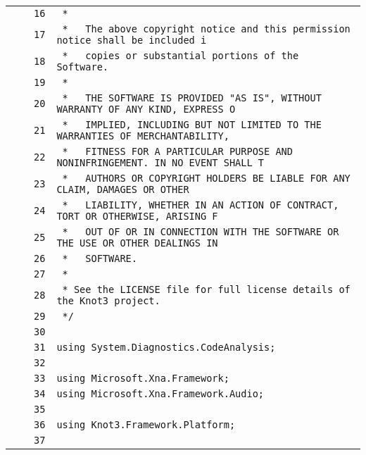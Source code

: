 \documentclass[a4paper,10pt]{article}
\begin{document}
\begin{longtable}[l]{lrrl}
\cellcolor{gray} &  & \verb~16~ & \verb~ *~\\
\cellcolor{gray} &  & \verb~17~ & \verb~ *   The above copyright notice and this permission notice shall be included i~\\
\cellcolor{gray} &  & \verb~18~ & \verb~ *   copies or substantial portions of the Software.~\\
\cellcolor{gray} &  & \verb~19~ & \verb~ *~\\
\cellcolor{gray} &  & \verb~20~ & \verb~ *   THE SOFTWARE IS PROVIDED "AS IS", WITHOUT WARRANTY OF ANY KIND, EXPRESS O~\\
\cellcolor{gray} &  & \verb~21~ & \verb~ *   IMPLIED, INCLUDING BUT NOT LIMITED TO THE WARRANTIES OF MERCHANTABILITY,~\\
\cellcolor{gray} &  & \verb~22~ & \verb~ *   FITNESS FOR A PARTICULAR PURPOSE AND NONINFRINGEMENT. IN NO EVENT SHALL T~\\
\cellcolor{gray} &  & \verb~23~ & \verb~ *   AUTHORS OR COPYRIGHT HOLDERS BE LIABLE FOR ANY CLAIM, DAMAGES OR OTHER~\\
\cellcolor{gray} &  & \verb~24~ & \verb~ *   LIABILITY, WHETHER IN AN ACTION OF CONTRACT, TORT OR OTHERWISE, ARISING F~\\
\cellcolor{gray} &  & \verb~25~ & \verb~ *   OUT OF OR IN CONNECTION WITH THE SOFTWARE OR THE USE OR OTHER DEALINGS IN~\\
\cellcolor{gray} &  & \verb~26~ & \verb~ *   SOFTWARE.~\\
\cellcolor{gray} &  & \verb~27~ & \verb~ *~\\
\cellcolor{gray} &  & \verb~28~ & \verb~ * See the LICENSE file for full license details of the Knot3 project.~\\
\cellcolor{gray} &  & \verb~29~ & \verb~ */~\\
\cellcolor{gray} &  & \verb~30~ & \verb~~\\
\cellcolor{gray} &  & \verb~31~ & \verb~using System.Diagnostics.CodeAnalysis;~\\
\cellcolor{gray} &  & \verb~32~ & \verb~~\\
\cellcolor{gray} &  & \verb~33~ & \verb~using Microsoft.Xna.Framework;~\\
\cellcolor{gray} &  & \verb~34~ & \verb~using Microsoft.Xna.Framework.Audio;~\\
\cellcolor{gray} &  & \verb~35~ & \verb~~\\
\cellcolor{gray} &  & \verb~36~ & \verb~using Knot3.Framework.Platform;~\\
\cellcolor{gray} &  & \verb~37~ & \verb~~\\

\end{longtable}
\end{document}

